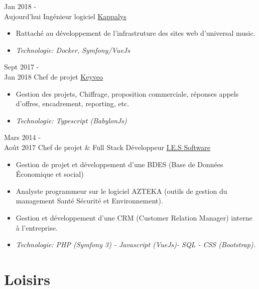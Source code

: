 \documentclass[letterpaper]{twentysecondcv} %
\begin{document}
\begin{twenty} %
	\twentyitem
    	{Jan 2018 - \\Aujourd'hui}
        {Ingénieur logiciel}
        {\href{https://www.kappalys.com/}{Kappalys}}
        {}
        {\begin{itemize}
        \item Rattaché au développement de l'infrastruture des sites web d'universal music.
        \item \textit{Technologie: Docker, Symfony/VueJs}
        \end{itemize}
        }
	\twentyitem
    	{Sept 2017 - \\Jan 2018}
        {Chef de projet}
        {\href{http://www.keyveo.com/fr/}{Keyveo}}
        {}
        {\begin{itemize}
        \item Gestion des projets, Chiffrage, proposition commerciale, réponses appels d'offres, encadrement, reporting, etc.
        \item \textit{Technologie: Typescript (BabylonJs)}
        \end{itemize}
        }
	\twentyitem
    	{Mars 2014 - \\Août 2017}
        {Chef de projet \& Full Stack Développeur}
        {\href{http://www.i-e-s.fr/}{I.E.S Software}}
        {}
        {
        {\begin{itemize}
        \item Gestion de projet et développement d'une BDES (Base de Données Économique et social)
        \item Analyste programmeur sur le logiciel AZTEKA (outils de gestion du management Santé Sécurité et Environnement).
        \item Gestion et développement d'une CRM (Customer Relation Manager) interne à l'entreprise.
        \item \textit{Technologie: PHP (Symfony 3) - Javascript (VueJs)- SQL - CSS (Bootstrap).}
    	\end{itemize}}
        }
\end{twenty}

\section{Loisirs}
\end{document}
